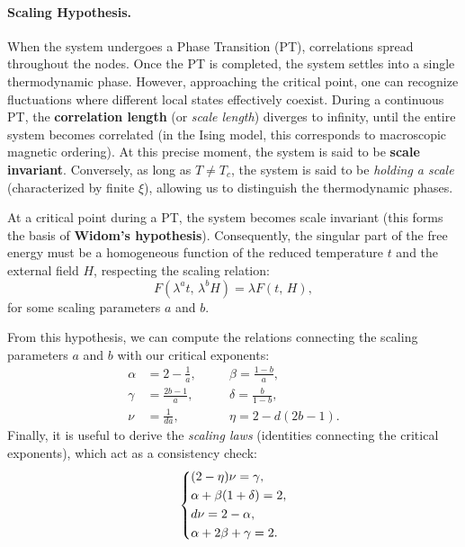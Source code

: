 \paragraph{Scaling Hypothesis.}
When the system undergoes a Phase Transition (PT), correlations spread throughout the nodes. Once the PT is completed, the system settles into a single thermodynamic phase. However, approaching the critical point, one can recognize fluctuations where different local states effectively coexist. During a continuous PT, the \textbf{correlation length} (or \textit{scale length}) diverges to infinity, until the entire system becomes correlated (in the Ising model, this corresponds to macroscopic magnetic ordering). At this precise moment, the system is said to be \textbf{scale invariant}. Conversely, as long as \(T \neq T_c\), the system is said to be \textit{holding a scale} (characterized by finite \(\xi\)), allowing us to distinguish the thermodynamic phases.

\begin{theorem}
    At a critical point during a PT, the system becomes scale invariant (this forms the basis of \textbf{Widom's hypothesis}). Consequently, the singular part of the free energy must be a homogeneous function of the reduced temperature \(t\) and the external field \(H\), respecting the scaling relation:
    \begin{equation}
        F(\lambda^a t,\, \lambda^b H) = \lambda F(t,\,H),
        \label{eq:scaling_hypothesis}
    \end{equation}
    for some scaling parameters \(a\) and \(b\).
\end{theorem}

From this hypothesis, we can compute the relations connecting the scaling parameters \(a\) and \(b\) with our critical exponents:
\[
    \begin{aligned}
        \alpha & = 2 - \frac{1}{a},\quad &  & \beta = \frac{1-b}{a},  \\
        \gamma & = \frac{2b-1}{a},\quad  &  & \delta = \frac{b}{1-b}, \\
        \nu    & = \frac{1}{da},\quad    &  & \eta = 2-d(2b-1).
    \end{aligned}
\]
Finally, it is useful to derive the \textit{scaling laws} (identities connecting the critical exponents), which act as a consistency check:
\begin{equation}
    \begin{dcases}
        (2 -\eta) \nu = \gamma,         \\
        \alpha + \beta(1 + \delta) = 2, \\
        d \nu = 2 - \alpha,             \\
        \alpha + 2\beta + \gamma = 2.
    \end{dcases}
    \label{eq:scaling_relations}
\end{equation}

